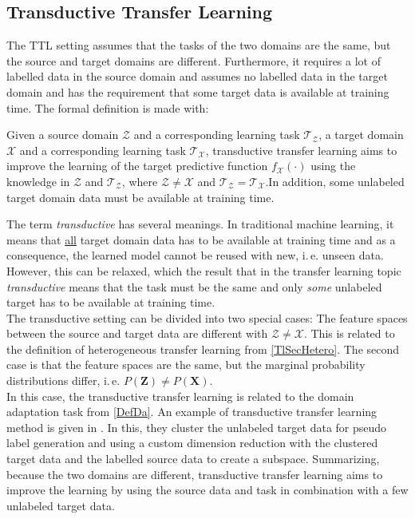 \subsection{Transductive Transfer Learning}\label{TlSubSecTrans}
The \ac{TTL} setting assumes that the tasks of the two domains are the same, but the source and target domains are different.
Furthermore, it requires a lot of labelled data in the source domain and assumes no labelled data in the target domain and has the requirement that some target data is available at training time.\cite{Pan.2010}
The formal definition is made with:
\begin{mDef}\label{DefTTL}
	 Given a source domain $\mathcal{Z}$ and a corresponding learning task $\mathcal{T_Z}$, a target domain $\mathcal{X}$ and a corresponding learning task $\mathcal{T_X}$, transductive transfer learning aims to improve the learning of the target predictive function $f_\mathcal{X}(\cdot)$ using the knowledge in $\mathcal{Z}$ and $\mathcal{T_Z}$, where $\mathcal{Z} \neq \mathcal{X}$ and $\mathcal{T_Z} = \mathcal{T_X}$.In addition, some unlabeled target domain data must be available at training time.
\end{mDef}
The term \textit{transductive} has several meanings.
In traditional machine learning, it means that \underline{all} target domain data has to be available at training time and as a consequence, the learned model cannot be reused with new, i.\,e. unseen data.
However, this can be relaxed, which the result that in the transfer learning topic \textit{transductive} means that the task must be the same and only \textit{some} unlabeled target has to be available at training time.\cite{Pan.2010}\\
The transductive setting can be divided into two special cases:
The feature spaces between the source and target data are different with $\mathcal{Z} \neq \mathcal{X}$.
This is related to the definition of heterogeneous transfer learning from \ref{TlSecHetero}.
The second case is that the feature spaces are the same, but the marginal probability distributions differ, i.\,e. $P(\mathbf{Z}) \neq P(\mathbf{X})$.\cite{Pan.2010}\\
In this case, the transductive transfer learning is related to the domain adaptation task from \ref{DefDa}.
An example of transductive transfer learning method is given in \cite{Wang.2008}.
In this, they cluster the unlabeled target data for pseudo label generation and using a custom dimension reduction with the clustered target data and the labelled source data to create a subspace.
Summarizing, because the two domains are different, transductive transfer learning aims to improve the learning by using the source data and task in combination with a few unlabeled target data.

